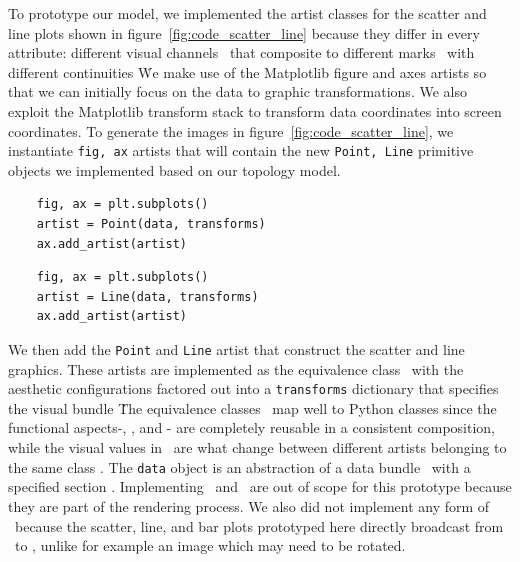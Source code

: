 \documentclass[../main.tex]{subfiles}
\begin{document}
To prototype our model, we implemented the artist classes for the scatter and line plots shown in figure~\ref{fig:code_scatter_line} because they differ in every attribute: different visual channels \vchannel\ that composite to different marks \vmark\ with different continuities \vindex\.  We make use of the Matplotlib figure and axes artists \cite{hunterArchitectureOpenSource,hunterMatplotlib2DGraphics2007} so that we can initially focus on the data to graphic transformations. We also exploit the Matplotlib transform stack to transform data coordinates into screen coordinates. To generate the images in figure~\ref{fig:code_scatter_line}, we instantiate \texttt{fig, ax} artists that will contain the new \texttt{Point, Line} primitive objects we implemented based on our topology model. 

\begin{multicols*}{2}
\begin{verbatim}
    fig, ax = plt.subplots()
    artist = Point(data, transforms)
    ax.add_artist(artist)
\end{verbatim}
\columnbreak
\begin{verbatim}
    fig, ax = plt.subplots()
    artist = Line(data, transforms)
    ax.add_artist(artist)
\end{verbatim}
\end{multicols*}

We then add the \texttt{Point} and \texttt{Line} artist that construct the scatter and line graphics. These artists are implemented as the equivalence class \vartisteq\ with the aesthetic configurations factored out into a \texttt{transforms} dictionary that specifies the visual bundle \vtotal\. The equivalence classes \vartisteq\ map well to Python classes since the functional aspects-\vchannel, \vmarkd, and \vindex - are completely reusable in a consistent composition, while the visual values in \vtotal\ are what change between different artists belonging to the same class \vartisteq. The \texttt{data} object is an abstraction of a data bundle \dtotal\ with a specified section \dsection. Implementing \gtotal\ and \gsection\ are out of scope for this prototype because they are part of the rendering process. We also did not implement any form of \vindex\ because the scatter, line, and bar plots prototyped here directly broadcast from \dbasepoint\ to \gbasepoint, unlike for example an image which may need to be rotated. 
\end{document}

